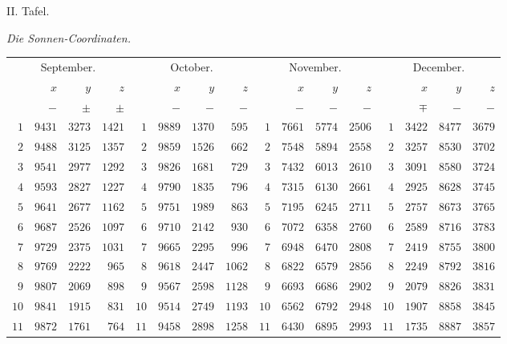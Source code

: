 \begin{center}
II. Tafel.

\medskip\emph{Die Sonnen-Coordinaten.}\medskip

\begingroup\fontsize{9}{10.2}\selectfont\setlength{\tabcolsep}{2pt}
\begin{tabular}{r|r|r|r||r|r|r|r||r|r|r|r||r|r|r|r}
\multicolumn{4}{c||}{September.} & \multicolumn{4}{c||}{October.} & \multicolumn{4}{c||}{November.} & \multicolumn{4}{c}{December.}\\[3pt]
 & $x$ & $y$ & $z$ &  & $x$ & $y$ & $z$ &  & $x$ & $y$ & $z$ &  & $x$ & $y$ & $z$\\
 & $-$ & $\pm$ & $\pm$ &  & $-$ & $-$ & $-$ &  & $-$ & $-$ & $-$ &  & $\mp$ & $-$ & $-$\\\hline
$1$ & $9431$ & $3273$ & $1421$ & $1$ & $9889$ & $1370$ & $595$ & $1$ & $7661$ & $5774$ & $2506$ & $1$ & $3422$ & $8477$ & $3679$\\
$2$ & $9488$ & $3125$ & $1357$ & $2$ & $9859$ & $1526$ & $662$ & $2$ & $7548$ & $5894$ & $2558$ & $2$ & $3257$ & $8530$ & $3702$\\
$3$ & $9541$ & $2977$ & $1292$ & $3$ & $9826$ & $1681$ & $729$ & $3$ & $7432$ & $6013$ & $2610$ & $3$ & $3091$ & $8580$ & $3724$\\
$4$ & $9593$ & $2827$ & $1227$ & $4$ & $9790$ & $1835$ & $796$ & $4$ & $7315$ & $6130$ & $2661$ & $4$ & $2925$ & $8628$ & $3745$\\
$5$ & $9641$ & $2677$ & $1162$ & $5$ & $9751$ & $1989$ & $863$ & $5$ & $7195$ & $6245$ & $2711$ & $5$ & $2757$ & $8673$ & $3765$\\[3pt]
$6$ & $9687$ & $2526$ & $1097$ & $6$ & $9710$ & $2142$ & $930$ & $6$ & $7072$ & $6358$ & $2760$ & $6$ & $2589$ & $8716$ & $3783$\\
$7$ & $9729$ & $2375$ & $1031$ & $7$ & $9665$ & $2295$ & $996$ & $7$ & $6948$ & $6470$ & $2808$ & $7$ & $2419$ & $8755$ & $3800$\\
$8$ & $9769$ & $2222$ & $965$ & $8$ & $9618$ & $2447$ & $1062$ & $8$ & $6822$ & $6579$ & $2856$ & $8$ & $2249$ & $8792$ & $3816$\\
$9$ & $9807$ & $2069$ & $898$ & $9$ & $9567$ & $2598$ & $1128$ & $9$ & $6693$ & $6686$ & $2902$ & $9$ & $2079$ & $8826$ & $3831$\\
$10$ & $9841$ & $1915$ & $831$ & $10$ & $9514$ & $2749$ & $1193$ & $10$ & $6562$ & $6792$ & $2948$ & $10$ & $1907$ & $8858$ & $3845$\\[3pt]
$11$ & $9872$ & $1761$ & $764$ & $11$ & $9458$ & $2898$ & $1258$ & $11$ & $6430$ & $6895$ & $2993$ & $11$ & $1735$ & $8887$ & $3857$\\

\end{tabular}
\end{center}
